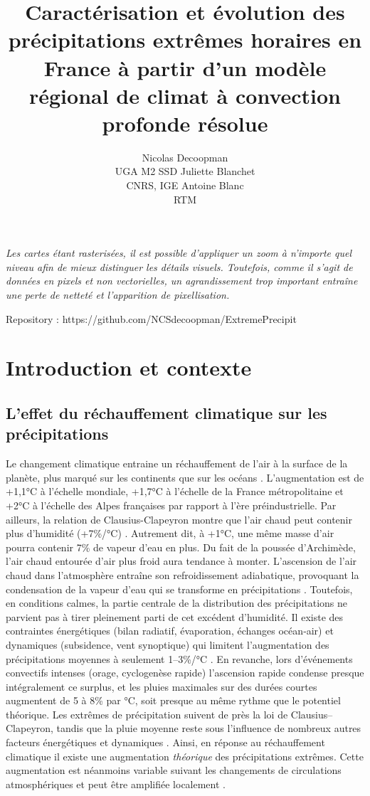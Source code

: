 \documentclass[
  article,
  nofooter,
  noheadings]{jss}
\author{Nicolas Decoopman\\UGA M2 SSD \And Juliette Blanchet\\CNRS,
IGE \And Antoine Blanc\\RTM}
\title{Caractérisation et évolution des précipitations extrêmes horaires
en France à partir d'un modèle régional de climat à convection profonde
résolue}
\begin{document}
\maketitle


\emph{Les cartes étant rasterisées, il est possible d'appliquer un zoom
à n'importe quel niveau afin de mieux distinguer les détails visuels.
Toutefois, comme il s'agit de données en pixels et non vectorielles, un
agrandissement trop important entraîne une perte de netteté et
l'apparition de pixellisation.}

Repository : https://github.com/NCSdecoopman/ExtremePrecipit

\newpage

\section{Introduction et contexte}\label{introduction-et-contexte}

\subsection{L'effet du réchauffement climatique sur les
précipitations}\label{leffet-du-ruxe9chauffement-climatique-sur-les-pruxe9cipitations}

Le changement climatique entraine un réchauffement de l'air à la surface
de la planète, plus marqué sur les continents que sur les océans
\citep{IPCC2021}. L'augmentation est de +1,1°C à l'échelle mondiale,
+1,7°C à l'échelle de la France métropolitaine et +2°C à l'échelle des
Alpes françaises par rapport à l'ère préindustrielle. Par ailleurs, la
relation de Clausius-Clapeyron montre que l'air chaud peut contenir plus
d'humidité (+7\%/°C) \citep{clapeyron1834}. Autrement dit, à +1°C, une
même masse d'air pourra contenir 7\% de vapeur d'eau en plus. Du fait de
la poussée d'Archimède, l'air chaud entourée d'air plus froid aura
tendance à monter. L'ascension de l'air chaud dans l'atmosphère entraîne
son refroidissement adiabatique, provoquant la condensation de la vapeur
d'eau qui se transforme en précipitations \citep{meteofrance}.
Toutefois, en conditions calmes, la partie centrale de la distribution
des précipitations ne parvient pas à tirer pleinement parti de cet
excédent d'humidité. Il existe des contraintes énergétiques (bilan
radiatif, évaporation, échanges océan‑air) et dynamiques (subsidence,
vent synoptique) qui limitent l'augmentation des précipitations moyennes
à seulement 1--3\%/°C \citep{IPCC2021}. En revanche, lors d'événements
convectifs intenses (orage, cyclogenèse rapide) l'ascension rapide
condense presque intégralement ce surplus, et les pluies maximales sur
des durées courtes augmentent de 5 à 8\% par °C, soit presque au même
rythme que le potentiel théorique. Les extrêmes de précipitation suivent
de près la loi de Clausius--Clapeyron, tandis que la pluie moyenne reste
sous l'influence de nombreux autres facteurs énergétiques et dynamiques
\citep{ogorman2015contrasting}. Ainsi, en réponse au réchauffement
climatique il existe une augmentation \emph{théorique} des
précipitations extrêmes. Cette augmentation est néanmoins variable
suivant les changements de circulations atmosphériques et peut être
amplifiée localement \citep{blanchet2021explaining}.
\end{document}
